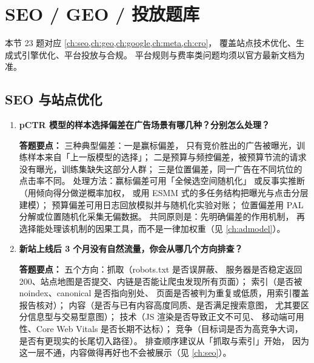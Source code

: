 \section{SEO / GEO / 投放题库}

本节 23 题对应 \cref{ch:seo,ch:geo,ch:google,ch:meta,ch:cro}，
覆盖站点技术优化、生成式引擎优化、平台投放与合规。
平台规则与费率类问题均须以官方最新文档为准。

\subsection{SEO 与站点优化}

\begin{interview}[题库与答题要点]

\begin{enumerate}[label=]

  \item[\textcolor{VioletDeep}{\textbf{Q79.}}] \textbf{pCTR 模型的样本选择偏差在广告场景有哪几种？分别怎么处理？}
\par\smallskip\noindent\textcolor{VioletDeep}{\textbf{答题要点：}}
三种典型偏差：一是赢标偏差，
只有竞价胜出的广告被曝光，训练样本来自「上一版模型的选择」；
二是预算与频控偏差，被预算节流的请求没有曝光，训练集缺失这部分人群；
三是位置偏差，同一广告在不同坑位的点击率不同。
处理方法：赢标偏差可用「全候选空间随机化」
或反事实推断（用倾向得分做逆概率加权，
或用 ESMM 式的多任务结构把曝光与点击分层建模）；
预算偏差可用日志回放模拟并与随机化实验对账；
位置偏差用 PAL 分解或位置随机化采集无偏数据。
共同原则是：先明确偏差的作用机制，
再选择能处理该机制的因果工具，而不是一律加权重（见 \cref{ch:admodel}）。

  \item[\textcolor{VioletDeep}{\textbf{Q80.}}] \textbf{新站上线后 3 个月没有自然流量，你会从哪几个方向排查？}
\par\smallskip\noindent\textcolor{VioletDeep}{\textbf{答题要点：}}
五个方向：抓取（robots.txt 是否误屏蔽、
服务器是否稳定返回 200、站点地图是否提交、内链是否能让爬虫发现所有页面）；
索引（是否被 noindex、canonical 是否指向别处、
页面是否被判为重复或低质，用索引覆盖报告核对）；
内容（是否与已有内容高度同质、是否满足搜索意图，
尤其要区分信息型与交易型意图）；
技术（JS 渲染是否导致正文不可见、
移动端可用性、Core Web Vitals 是否长期不达标）；
竞争（目标词是否为高竞争大词，是否有更现实的长尾切入路径）。
排查顺序建议从「抓取与索引」开始，
因为这一层不通，内容做得再好也不会被展示（见 \cref{ch:seo}）。


\end{enumerate}
\end{interview}
